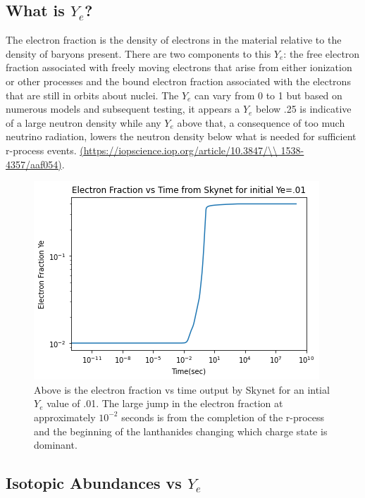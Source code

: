 \documentclass[11pt,a4paper]{article}
\begin{document}
\subsection{What is $Y_e$?}

The electron fraction is the density of electrons in the material relative to the density of baryons present. There are two components to this $Y_e$: the free electron fraction associated with freely moving electrons that arise from either ionization or other processes and the bound electron fraction associated with the electrons that are still in orbits about nuclei. The $Y_e$ can vary from 0 to 1 but based on numerous models and subsequent testing, it appears a $Y_e$ below .25 is indicative of a large neutron density while any $Y_e$ above that, a consequence of too much neutrino radiation, lowers the neutron density below what is needed for sufficient r-process events. \url{(https://iopscience.iop.org/article/10.3847/\\ 1538-4357/aaf054)}.


\begin{figure}[h!]
  \includegraphics[scale = .75]{Ye_time.png}
  \centering
  \caption{Above is the electron fraction vs time output by Skynet for an intial $Y_e$ value of .01. The large jump in the electron fraction at approximately $10^{-2}$ seconds is from the completion of the r-process and the beginning of the lanthanides changing which charge state is dominant. }
\end{figure}


\subsection{Isotopic Abundances vs $Y_e$}
\end{document}
